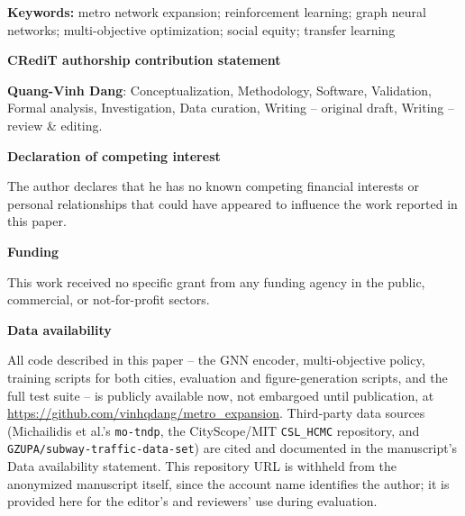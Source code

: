 \documentclass[11pt,a4paper]{article}
\begin{document}
\vspace{1em}
\noindent
\textbf{Keywords:} metro network expansion; reinforcement learning; graph neural networks; multi-objective optimization; social equity; transfer learning

\vspace{2em}
\noindent
\textbf{CRediT authorship contribution statement}

\noindent
\textbf{Quang-Vinh Dang}: Conceptualization, Methodology, Software, Validation, Formal analysis, Investigation, Data curation, Writing -- original draft, Writing -- review \& editing.

\vspace{1em}
\noindent
\textbf{Declaration of competing interest}

\noindent
The author declares that he has no known competing financial interests or personal relationships that could have appeared to influence the work reported in this paper.

\vspace{1em}
\noindent
\textbf{Funding}

\noindent
This work received no specific grant from any funding agency in the public, commercial, or not-for-profit sectors.

\vspace{1em}
\noindent
\textbf{Data availability}

\noindent
All code described in this paper -- the GNN encoder, multi-objective policy, training scripts for both cities, evaluation and figure-generation scripts, and the full test suite -- is publicly available now, not embargoed until publication, at \url{https://github.com/vinhqdang/metro_expansion}. Third-party data sources (Michailidis et al.'s \texttt{mo-tndp}, the CityScope/MIT \texttt{CSL\_HCMC} repository, and \texttt{GZUPA/subway-traffic-data-set}) are cited and documented in the manuscript's Data availability statement. This repository URL is withheld from the anonymized manuscript itself, since the account name identifies the author; it is provided here for the editor's and reviewers' use during evaluation.
\end{document}
